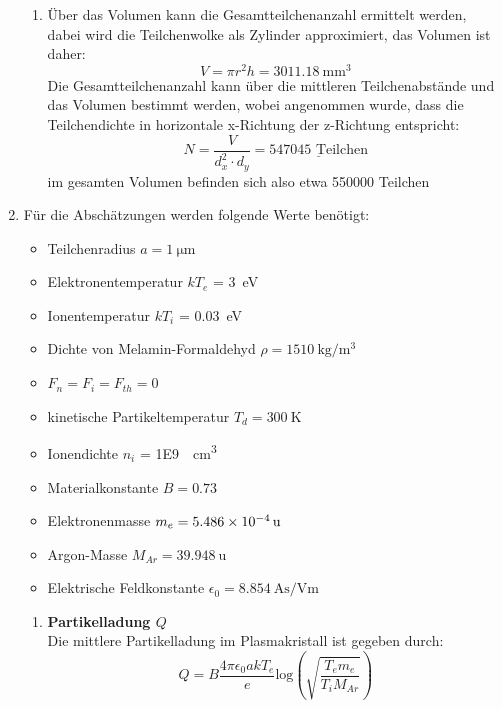 \documentclass[12pt,a4paper,ngerman]{article}
\begin{document}
\begin{enumerate}[font=\bfseries]
\begin{enumerate}[font=\bfseries, label=\alph*)]
	\item Über das Volumen kann die Gesamtteilchenanzahl ermittelt werden, dabei wird die Teilchenwolke als Zylinder approximiert, das Volumen ist daher:
	\begin{equation}
		V = \pi r^2 h = \SI{3011.18}{\milli \meter \cubed}
	\end{equation} 
	Die Gesamtteilchenanzahl kann über die mittleren Teilchenabstände und das Volumen bestimmt werden, wobei angenommen wurde, dass die Teilchendichte in horizontale x-Richtung der z-Richtung entspricht:
	\begin{equation}
		N = \frac{V}{d_x^2 \cdot d_y} = \underline{ 547045 \, \,\text{Teilchen}}
	\end{equation}
	im gesamten Volumen befinden sich also etwa 550000 Teilchen
	\end{enumerate}
		\item 	Für die Abschätzungen werden folgende Werte benötigt:
		\begin{itemize}
			\item Teilchenradius $a = \SI{1}{\micro \meter}$
			\item Elektronentemperatur $kT_e$ = \SI{3}{\eV}
			\item Ionentemperatur $kT_i$ = \SI{0.03}{\eV}
			\item Dichte von Melamin-Formaldehyd $\rho = \SI{1510}{\kilogram \per \meter \cubed}$
			\item $F_n = F_i = F_{th} = 0$
			\item kinetische Partikeltemperatur $T_d = \SI{300}{\kelvin}$
			\item Ionendichte $n_i$ = \SI{1E9}{\per \centi \meter \cubed}
			\item Materialkonstante $B = 0.73$
			\item Elektronenmasse $m_e = \SI{5.486E-4}{\atomicmassunit}$
			\item Argon-Masse $M_{Ar} = \SI{39.948}{\atomicmassunit}$
			\item Elektrische Feldkonstante $\epsilon_0 = \SI{8.854}{\ampere \second \per \volt \meter}$
		\end{itemize}
	\begin{enumerate}[font=\bfseries, label=\alph*)]
			\item \textbf{Partikelladung $Q$}\\
			 Die mittlere Partikelladung im Plasmakristall ist gegeben durch:
			\begin{equation}
				Q = B \frac{4 \pi \epsilon_0 a k T_e}{e} \text{log}\left(\sqrt{\frac{T_e m_e}{T_i M_{Ar}}}\right)

\end{equation}
\end{enumerate}
\end{enumerate}
\end{document}
